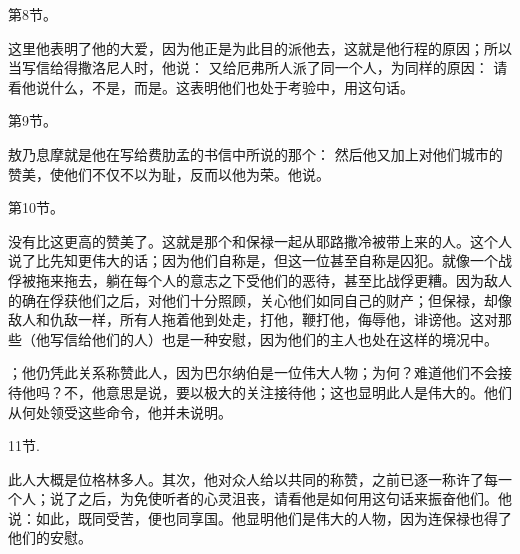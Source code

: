 第8节。 \par

这里他表明了他的大爱，因为他正是为此目的派他去，这就是他行程的原因；所以当写信给得撒洛尼人时，他说：  又给厄弗所人派了同一个人，为同样的原因：  请看他说什么，不是，而是。这表明他们也处于考验中，用这句话。\par

第9节。 \par

敖乃息摩就是他在写给费肋孟的书信中所说的那个：  然后他又加上对他们城市的赞美，使他们不仅不以为耻，反而以他为荣。他说。\par

第10节。 \par

没有比这更高的赞美了。这就是那个和保禄一起从耶路撒冷被带上来的人。这个人说了比先知更伟大的话；因为他们自称是，但这一位甚至自称是囚犯。就像一个战俘被拖来拖去，躺在每个人的意志之下受他们的恶待，甚至比战俘更糟。因为敌人的确在俘获他们之后，对他们十分照顾，关心他们如同自己的财产；但保禄，却像敌人和仇敌一样，所有人拖着他到处走，打他，鞭打他，侮辱他，诽谤他。这对那些（他写信给他们的人）也是一种安慰，因为他们的主人也处在这样的境况中。\par

；他仍凭此关系称赞此人，因为巴尔纳伯是一位伟大人物；为何？难道他们不会接待他吗？不，他意思是说，要以极大的关注接待他；这也显明此人是伟大的。他们从何处领受这些命令，他并未说明。\par

11节. \par

此人大概是位格林多人。其次，他对众人给以共同的称赞，之前已逐一称许了每一个人；说了之后，为免使听者的心灵沮丧，请看他是如何用这句话来振奋他们。他说：如此，既同受苦，便也同享国。他显明他们是伟大的人物，因为连保禄也得了他们的安慰。\par

